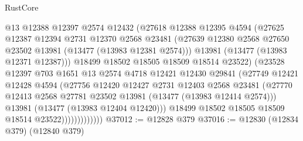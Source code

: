 \begin{lexlean}{RustCore}
\begin{coremodule}
                          @13
                          @12388
                          @12397
                          @2574
                          @12432
                          (@27618
                            @12388
                            @12395
                            @4594
                            (@27625
                              @12387
                              @12394
                              @2731
                              @12370
                              @2568
                              @23481
                              (@27639
                                @12380
                                @2568
                                @27650
                                @23502
                                @13981
                                (@13477 (@13983 @12381 @2574)))
                              @13981
                              (@13477 (@13983 @12371 @12387)))
                            @18499
                            @18502
                            @18505
                            @18509
                            @18514
                            @23522)
                          (@23528
                            @12397
                            @703
                            @1651
                            @13
                            @2574
                            @4718
                            @12421
                            @12430
                            @29841
                            (@27749
                              @12421
                              @12428
                              @4594
                              (@27756
                                @12420
                                @12427
                                @2731
                                @12403
                                @2568
                                @23481
                                (@27770
                                  @12413
                                  @2568
                                  @27781
                                  @23502
                                  @13981
                                  (@13477 (@13983 @12414 @2574)))
                                @13981
                                (@13477 (@13983 @12404 @12420)))
                              @18499
                              @18502
                              @18505
                              @18509
                              @18514
                              @23522)))))))))))))
@37012 := @12828 @379
@37016 := @12830 (@12834 @379) (@12840 @379)

\end{coremodule}
\end{lexlean}
